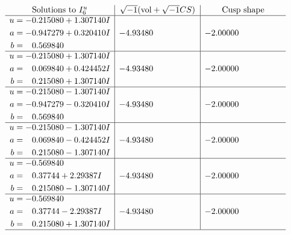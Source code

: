 \documentclass[1p]{elsarticle_modified}
\theoremstyle{definition}
\newcommand{\I}{\sqrt{-1}}
\begin{document}
$$\begin{array}{c|c|c}  
\text{Solutions to }I^u_{6}& \I (\text{vol} + \sqrt{-1}CS) & \text{Cusp shape}\\
 \hline 
\begin{aligned}
u &= -0.215080 + 1.307140 I \\
a &= -0.947279 + 0.320410 I \\
b &= \phantom{-}0.569840\phantom{ +0.000000I}\end{aligned}
 & -4.93480\phantom{ +0.000000I} & -2.00000\phantom{ +0.000000I} \\ \hline\begin{aligned}
u &= -0.215080 + 1.307140 I \\
a &= \phantom{-}0.069840 + 0.424452 I \\
b &= \phantom{-}0.215080 + 1.307140 I\end{aligned}
 & -4.93480\phantom{ +0.000000I} & -2.00000\phantom{ +0.000000I} \\ \hline\begin{aligned}
u &= -0.215080 - 1.307140 I \\
a &= -0.947279 - 0.320410 I \\
b &= \phantom{-}0.569840\phantom{ +0.000000I}\end{aligned}
 & -4.93480\phantom{ +0.000000I} & -2.00000\phantom{ +0.000000I} \\ \hline\begin{aligned}
u &= -0.215080 - 1.307140 I \\
a &= \phantom{-}0.069840 - 0.424452 I \\
b &= \phantom{-}0.215080 - 1.307140 I\end{aligned}
 & -4.93480\phantom{ +0.000000I} & -2.00000\phantom{ +0.000000I} \\ \hline\begin{aligned}
u &= -0.569840\phantom{ +0.000000I} \\
a &= \phantom{-}0.37744 + 2.29387 I \\
b &= \phantom{-}0.215080 - 1.307140 I\end{aligned}
 & -4.93480\phantom{ +0.000000I} & -2.00000\phantom{ +0.000000I} \\ \hline\begin{aligned}
u &= -0.569840\phantom{ +0.000000I} \\
a &= \phantom{-}0.37744 - 2.29387 I \\
b &= \phantom{-}0.215080 + 1.307140 I\end{aligned}
 & -4.93480\phantom{ +0.000000I} & -2.00000\phantom{ +0.000000I}\\
 \hline 
 \end{array}$$\newpage
\end{document}

